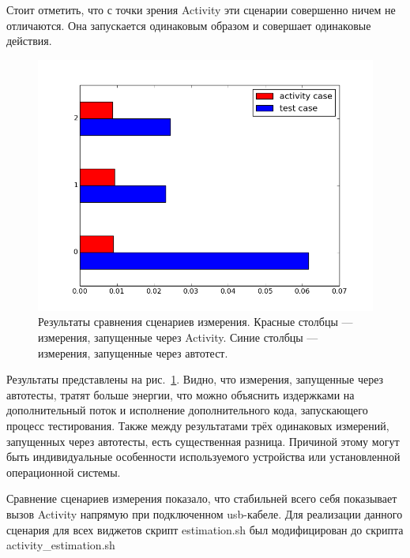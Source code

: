 \documentclass[a4paper,14pt]{extarticle} %
\begin{document}
	Стоит отметить, что с точки зрения Activity эти сценарии совершенно ничем не отличаются. Она запускается одинаковым образом и совершает одинаковые действия.
	
	\begin{figure}[tbh]
		\includegraphics[width=\textwidth]{test_comparation}
		\caption{Результаты сравнения  сценариев измерения. Красные столбцы --- измерения, запущенные через Activity. Синие столбцы --- измерения, запущенные через автотест.}
		\label{fig:test_comparation}
	\end{figure}

	Результаты представлены на рис.~\ref{fig:test_comparation}. Видно, что измерения, запущенные через автотесты, тратят больше энергии, что можно объяснить издержками на дополнительный поток и исполнение дополнительного кода, запускающего процесс тестирования. Также между результатами трёх одинаковых измерений, запущенных через автотесты, есть существенная разница. Причиной этому могут быть индивидуальные особенности используемого устройства или установленной операционной системы.
	
	Сравнение сценариев измерения показало, что стабильней всего себя показывает вызов Activity напрямую при подключенном usb-кабеле. Для реализации данного сценария для всех виджетов скрипт estimation.sh был модифицирован до скрипта activity\_estimation.sh~\ris{\ref{fig:activity_estimation}}
	
\end{document}
